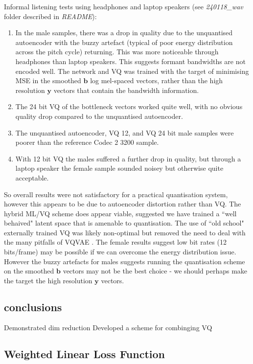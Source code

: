 \documentclass{article}
\begin{document}
Informal listening tests using headphones and laptop speakers (see \emph{240118\_wav} folder described in \emph{README}):
\begin{enumerate}
\item In the male samples, there was a drop in quality due to the unquantised autoencoder with the buzzy artefact (typical of poor energy distribution across the pitch cycle) returning.  This was more noticeable through headphones than laptop speakers. This suggests formant bandwidths are not encoded well.  The network and VQ was trained with the target of minimising MSE in the smoothed $\mathbf{b}$ log mel-spaced vectors, rather than the high resolution $\mathbf{y}$ vectors that contain the bandwidth information.
\item The 24 bit VQ of the bottleneck vectors worked quite well, with no obvious quality drop compared to the unquantised autoencoder.
\item The unquantised autoencoder, VQ 12, and VQ 24 bit male samples were poorer than the reference Codec 2 3200 sample.
\item With 12 bit VQ the males suffered a further drop in quality, but through a laptop speaker the female sample sounded noisey but otherwise quite acceptable.
\end{enumerate} 
So overall results were not satisfactory for a practical quantisation system, however this appears to be due to autoencoder distortion rather than VQ. The hybrid ML/VQ scheme does appear viable, suggested we have trained a ``well behaived" latent space that is amenable to quantisation. The use of ``old school" externally trained VQ was likely non-optimal but removed the need to deal with the many pitfalls of VQVAE \cite{mentzer2023finite}. The female results suggest low bit rates (12 bits/frame) may be possible if we can overcome the energy distribution issue.  However the buzzy artefacts for males suggests running the quantisation scheme on the smoothed $\mathbf{b}$ vectors may not be the best choice - we should perhaps make the target the high resolution $\mathbf{y}$ vectors.

\subsection{conclusions}

Demonstrated dim reduction
Developed a scheme for combinging VQ

\subsection{Weighted Linear Loss Function}
\end{document}
